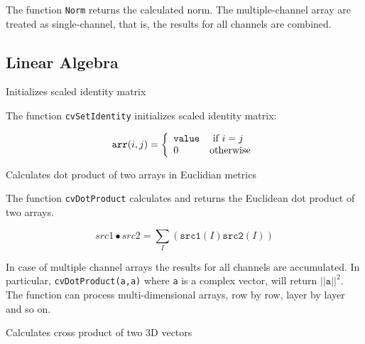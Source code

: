 The function \texttt{Norm} returns the calculated norm. The multiple-channel array are treated as single-channel, that is, the results for all channels are combined.


\subsection{Linear Algebra}


Initializes scaled identity matrix


\begin{description}
\end{description}

The function \texttt{cvSetIdentity} initializes scaled identity matrix:

\[
\texttt{arr}(i,j)=\left\{ \begin{array}{l l} \texttt{value} & \mbox{ if $i=j$}\\ 0 & \mbox{otherwise}\\ \end{array} \right.
\]


Calculates dot product of two arrays in Euclidian metrics


\begin{description}
\end{description}

The function \texttt{cvDotProduct} calculates and returns the Euclidean dot product of two arrays.

\[
src1 \bullet src2 = \sum_I (\texttt{src1}(I) \texttt{src2}(I))
\]

In case of multiple channel arrays the results for all channels are accumulated. In particular, \texttt{cvDotProduct(a,a)} where \texttt{a} is a complex vector, will return $||\texttt{a}||^2$.
The function can process multi-dimensional arrays, row by row, layer by layer and so on.


Calculates cross product of two 3D vectors

